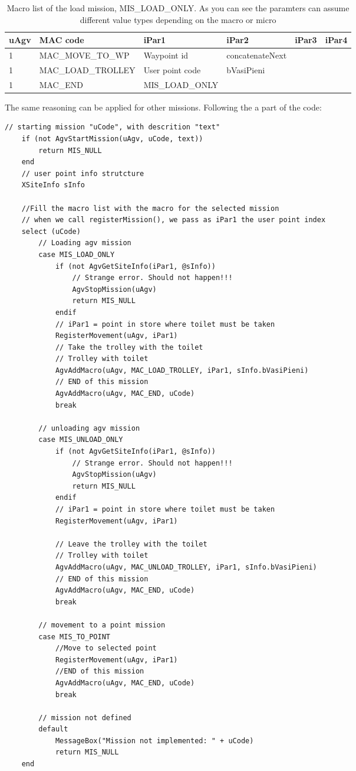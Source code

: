 \begin{table}[h]
	\begin{tabular}{ | l | l | l  | l | l  | l |}
		\hline
		uAgv & MAC code           & iPar1           & iPar2           & iPar3 & iPar4 \\ \hline
		1    & MAC\_MOVE\_TO\_WP  & Waypoint id     & concatenateNext &       &  \\ \hline
		1    & MAC\_LOAD\_TROLLEY & User point code & bVasiPieni      &       &  \\ \hline
		1    & MAC\_END           & MIS\_LOAD\_ONLY &                 &       &  \\ \hline
	\end{tabular}
	\caption{Macro list of the load mission, MIS\_LOAD\_ONLY. As you can see the paramters can assume different value types depending on the macro or micro}
	\label{tab:macrolist}
\end{table}

The same reasoning can be applied for other missions. Following the a part of the code:

\begin{lstlisting}[caption=RegisterMission() code fragment, label=lstRegisterMission]
	// starting mission "uCode", with descrition "text"
	if (not AgvStartMission(uAgv, uCode, text))
		return MIS_NULL
	end
	// user point info strutcture
	XSiteInfo sInfo
	
	//Fill the macro list with the macro for the selected mission
	// when we call registerMission(), we pass as iPar1 the user point index
	select (uCode)
		// Loading agv mission
		case MIS_LOAD_ONLY
			if (not AgvGetSiteInfo(iPar1, @sInfo))
				// Strange error. Should not happen!!!
				AgvStopMission(uAgv)
				return MIS_NULL
			endif
			// iPar1 = point in store where toilet must be taken
			RegisterMovement(uAgv, iPar1)
			// Take the trolley with the toilet
			// Trolley with toilet
			AgvAddMacro(uAgv, MAC_LOAD_TROLLEY, iPar1, sInfo.bVasiPieni)
			// END of this mission
			AgvAddMacro(uAgv, MAC_END, uCode)
			break
			
		// unloading agv mission
		case MIS_UNLOAD_ONLY
			if (not AgvGetSiteInfo(iPar1, @sInfo))
				// Strange error. Should not happen!!!
				AgvStopMission(uAgv)
				return MIS_NULL
			endif
			// iPar1 = point in store where toilet must be taken
			RegisterMovement(uAgv, iPar1)
			
			// Leave the trolley with the toilet
			// Trolley with toilet
			AgvAddMacro(uAgv, MAC_UNLOAD_TROLLEY, iPar1, sInfo.bVasiPieni)
			// END of this mission
			AgvAddMacro(uAgv, MAC_END, uCode)
			break
		
		// movement to a point mission
		case MIS_TO_POINT
			//Move to selected point
			RegisterMovement(uAgv, iPar1)
			//END of this mission
			AgvAddMacro(uAgv, MAC_END, uCode)
			break
			
		// mission not defined
		default
			MessageBox("Mission not implemented: " + uCode)
			return MIS_NULL
	end

\end{lstlisting}

